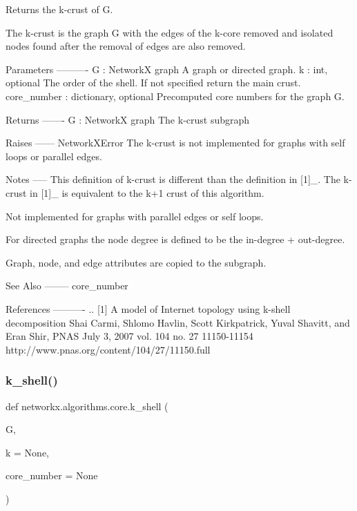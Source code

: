\begin{DoxyVerb}Returns the k-crust of G.

The k-crust is the graph G with the edges of the k-core removed
and isolated nodes found after the removal of edges are also removed.

Parameters
----------
G : NetworkX graph
   A graph or directed graph.
k : int, optional
  The order of the shell.  If not specified return the main crust.
core_number : dictionary, optional
  Precomputed core numbers for the graph G.

Returns
-------
G : NetworkX graph
   The k-crust subgraph

Raises
------
NetworkXError
    The k-crust is not implemented for graphs with self loops
    or parallel edges.

Notes
-----
This definition of k-crust is different than the definition in [1]_.
The k-crust in [1]_ is equivalent to the k+1 crust of this algorithm.

Not implemented for graphs with parallel edges or self loops.

For directed graphs the node degree is defined to be the
in-degree + out-degree.

Graph, node, and edge attributes are copied to the subgraph.

See Also
--------
core_number

References
----------
.. [1] A model of Internet topology using k-shell decomposition
   Shai Carmi, Shlomo Havlin, Scott Kirkpatrick, Yuval Shavitt,
   and Eran Shir, PNAS  July 3, 2007   vol. 104  no. 27  11150-11154
   http://www.pnas.org/content/104/27/11150.full
\end{DoxyVerb}
 \mbox{\label{namespacenetworkx_1_1algorithms_1_1core_ad9d262c33cdaf7f669f8cd323b015b7f}} 
\subsubsection{\texorpdfstring{k\+\_\+shell()}{k\_shell()}}
{\footnotesize\ttfamily def networkx.\+algorithms.\+core.\+k\+\_\+shell (\begin{DoxyParamCaption}\item[{}]{G,  }\item[{}]{k = {\ttfamily None},  }\item[{}]{core\+\_\+number = {\ttfamily None} }\end{DoxyParamCaption})}

